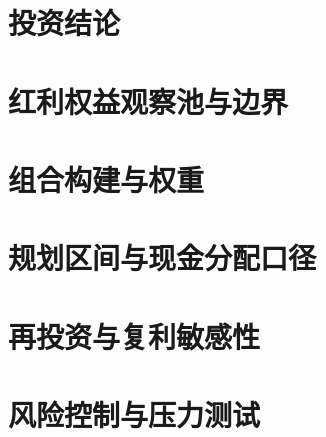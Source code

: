 \documentclass[a4paper,11pt,openany,fontset=none]{ctexrep}
\begin{document}
\astockcover

\begin{abstract}
本报告回答一个具体问题：固定20万元全额投资本金，如何在不把历史分红或某日价格误写为收益承诺的前提下，建立可复核的长期多资产风险预算？

核心结论：本模型明确指定CNY70,000的\texttt{511010}、CNY30,000的\texttt{510880}、条件性CNY30,000的\texttt{512890}和CNY20,000的\texttt{518880}；另将CNY40,000放入合格受保障流动性并保留CNY10,000交易现金。风险资产在资格包通过后按六个月计划分批建立；任一ETF的产品、价格/IOPV、折溢价、价差、流动性或组合穿透未通过时，该笔资金不交易并唯一留在受保障流动性。公募REITs和直接高股息股票初始均为0\%。长期年化3\%--6\%只作为五年以上的公式敏感性区间；实际现金仅以税后、扣费后到账额$D_0$记录。

该框架不提供订单、目标价、短线择时或保证收益。当前执行日资格包尚未运行，报告不表示任何ETF已具备实施资格。基准稳健核心在12个月共同承压规划情景下的算术损失为16.30\%，即固定本金约CNY32,600，目的在于检验风险承受与流动性；它不会自行触发账户实际回撤控制。
\end{abstract}

{\small
\setcounter{tocdepth}{0}
\tableofcontents
\par}
\clearpage

\chapter{投资结论}


\chapter{红利权益观察池与边界}


\chapter{组合构建与权重}


\chapter{规划区间与现金分配口径}


\chapter{再投资与复利敏感性}


\chapter{风险控制与压力测试}

\end{document}
